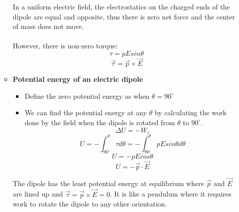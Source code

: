 \documentclass[12pt]{article}
\begin{document}
\begin{enumerate}
\begin{itemize}
\begin{figure}[H]
    \end{figure}
    In a uniform electric field, the electrostatics on the charged ends of the dipole are equal and opposite, thus there is zero net force and the center of mass does not move.\\\\
    However, there is non-zero torque:
    \[\tau=pEsin\theta\]
    \[\boxed{\vec{\tau}=\vec{p}\times\vec{E}}\]
\item \textbf{Potential energy of an electric dipole}
\begin{itemize}
    \item Define the zero potential energy as when $\theta=90^\circ$
    \item We can find the potential energy at any $\theta$ by calculating the work done by the field when the dipole is rotated from $\theta$ to $90^\circ$.
    \[\Delta U=-W_c\]
    \[U=-\int_{90^\circ}^{\theta}\tau d\theta=-\int_{90^\circ}^{\theta} pEsin\theta d\theta\]
    \[U=-pEcos\theta\]
    \[\boxed{U=-\vec{p}\cdot\vec{E}}\]
\end{itemize}
The dipole has the least potential energy at equilibrium where $\vec{p}$ and $\vec{E}$ are lined up and $\vec{\tau}=\vec{p}\times\vec{E}=0$. It is like a pendulum where it requires work to rotate the dipole to any other orientation.
    \end{itemize}
  
    
\end{enumerate}
\end{document}

